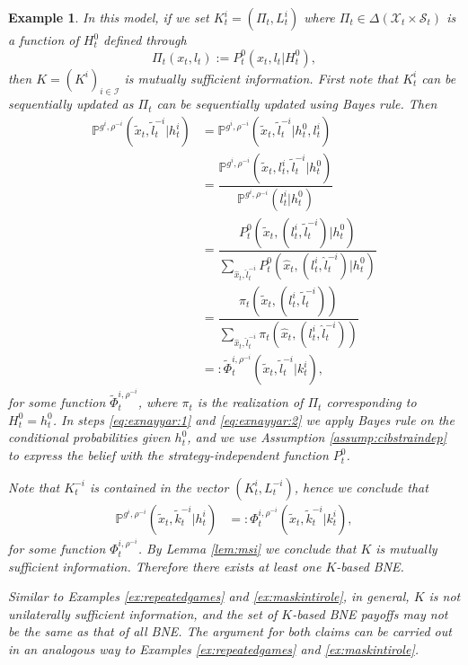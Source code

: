 \documentclass[pdflatex,sn-basic]{sn-jnl}
\renewcommand{\Pr}{\mathbb{P}}
\newcommand{\Comp}{K}
\newcommand{\comp}{k}
\theoremstyle{thmstyleone}%
\theoremstyle{thmstyletwo}%
\theoremstyle{thmstylethree}%
\newtheorem{example}{Example}
\begin{document}
\begin{example}
	In this model, if we set $\Comp_t^i=(\Pi_t, L_t^i)$ where $\Pi_t \in \Delta(\mathcal{X}_t\times \mathcal{S}_t)$ is a function of $H_t^0$ defined through
	\begin{equation}
		\Pi_t(x_t, l_t) :=  P_t^0(x_t, l_t|H_t^0),
	\end{equation}
	then $\Comp=(\Comp^i)_{i\in\mathcal{I}}$ is mutually sufficient information. First note that $\Comp_t^i$ can be sequentially updated as $\Pi_t$ can be sequentially updated using Bayes rule. Then
	\begin{align}
		\Pr^{g^i, \rho^{-i}}(\tilde{x}_t, \tilde{l}_t^{-i}|h_t^i) &= \Pr^{g^i, \rho^{-i}}(\tilde{x}_t, \tilde{l}_t^{-i}|h_t^0, l_t^i)\\ &=\dfrac{\Pr^{g^i, \rho^{-i}}(\tilde{x}_t, l_t^i, \tilde{l}_t^{-i}|h_t^0)}{\Pr^{g^i, \rho^{-i}}(l_t^i|h_t^0)}\label{eq:exnayyar:1} \\
	    &=\dfrac{P_t^{0}(\tilde{x}_t, (l_t^i, \tilde{l}_t^{-i})|h_t^0)}{\sum_{\hat{x}_t, \hat{l}_t^{-i}} P_t^0(\hat{x}_t, (l_t^i, \hat{l}_t^{-i})|h_t^0)}\label{eq:exnayyar:2} \\
		&=\dfrac{ \pi_t(\tilde{x}_t, (l_t^i, \tilde{l}_t^{-i})) }{\sum_{\hat{x}_t,\hat{l}_t^{-i}} \pi_t(\hat{x}_t, (l_t^i, \hat{l}_t^{-i})) }\label{eq:exnayyar:3} \\
		&=:\tilde{\Phi}_t^{i, \rho^{-i}}(\tilde{x}_t, \tilde{l}_t^{-i}|\comp_t^i),
	\end{align}
	for some function $\tilde{\Phi}_t^{i, \rho^{-i}}$, where $\pi_t$ is the realization of $\Pi_t$ corresponding to $H_t^0=h_t^0$. {In steps \eqref{eq:exnayyar:1} and \eqref{eq:exnayyar:2} we apply Bayes rule on the conditional probabilities given $h_t^0$, and we use Assumption \ref{assump:cibstraindep} to express the belief with the strategy-independent function $P_t^0$.} %
	
	Note that $\Comp_t^{-i}$ is {contained in the vector} $(\Comp_t^i, L_t^{-i})$, hence we conclude that
	\begin{align}
		\Pr^{g^i, \rho^{-i}}(\tilde{x}_t, \tilde{\comp}_t^{-i}|h_t^i)&=:\Phi_t^{i, \rho^{-i}}(\tilde{x}_t, \tilde{\comp}_t^{-i}|\comp_t^i),
	\end{align}
	for some function $\Phi_t^{i, \rho^{-i}}$. By Lemma \ref{lem:msi} we conclude that $\Comp$ is mutually sufficient information. Therefore there exists at least one $\Comp$-based BNE.
	
	Similar to Examples \ref{ex:repeatedgames} and \ref{ex:maskintirole}, in general, $\Comp$ is not unilaterally sufficient information, and the set of $\Comp$-based BNE payoffs may not be the same as that of all BNE. The argument for both claims can be carried out in an analogous way to Examples \ref{ex:repeatedgames} and \ref{ex:maskintirole}.
\end{example}
\end{document}
